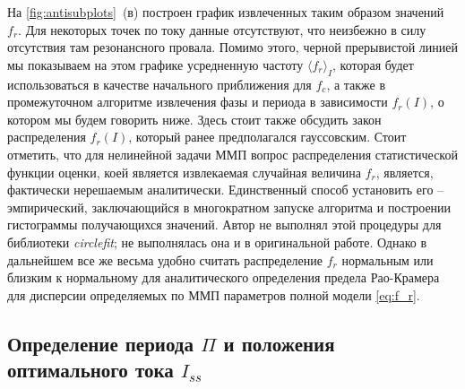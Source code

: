 \documentclass[14pt, a4paper]{extreport}
\numberwithin{equation}{section}
\begin{document}
На \autoref{fig:antisubplots}~(в) построен график извлеченных таким образом значений $f_r$. Для некоторых точек по току данные отсутствуют, что неизбежно в силу отсутствия там резонансного провала. Помимо этого, черной прерывистой линией мы показываем на этом графике усредненную частоту $\langle f_r\rangle_I$, которая будет использоваться в качестве начального приближения для $f_c$, а также в промежуточном алгоритме извлечения фазы и периода в зависимости $f_r(I)$, о котором мы будем говорить ниже. Здесь стоит также обсудить закон распределения $f_r(I)$, который ранее предполагался гауссовским. Стоит отметить, что для нелинейной задачи ММП вопрос распределения статистической функции оценки, коей является извлекаемая случайная величина $f_r$, является, фактически нерешаемым аналитически. Единственный способ установить его -- эмпирический, заключающийся в многократном запуске алгоритма и построении гистограммы получающихся значений. Автор не выполнял этой процедуры для библиотеки \foreignlanguage{english}{\textit{circlefit}}; не выполнялась она и в оригинальной работе. Однако в дальнейшем все же весьма удобно считать распределение $f_r$ нормальным или близким к нормальному для аналитического определения предела Рао-Крамера для дисперсии определяемых по ММП параметров полной модели \eqref{eq:f_r}.

\subsection{Определение периода $\Pi$ и положения оптимального тока $I_{ss}$}
\end{document}
